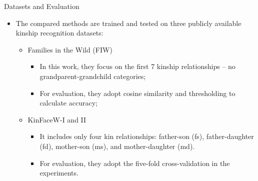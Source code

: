\documentclass[aspectratio=169,xcolor=dvipsnames]{beamer}
\begin{document}
\begin{frame}{Datasets and Evaluation}
    \begin{itemize}
        \item The compared methods are trained and tested on three publicly available kinship recognition datasets:
            \begin{itemize}
                \item Families in the Wild (FIW)
                    \begin{itemize}
                        \item In this work, they focus on the first 7 kinship relationships -- no grandparent-grandchild categories;
                        \item For evaluation, they adopt cosine similarity and thresholding to calculate accuracy;
                    \end{itemize}
                \item KinFaceW-I and II
                    \begin{itemize}
                        \item It includes only four kin relationships:  father-son (fs), father-daughter (fd), mother-son (ms), and mother-daughter (md).
                        \item For evaluation, they adopt the five-fold cross-validation in the experiments.
                    \end{itemize}
            \end{itemize}
    \end{itemize}
\end{frame}

\end{document}
